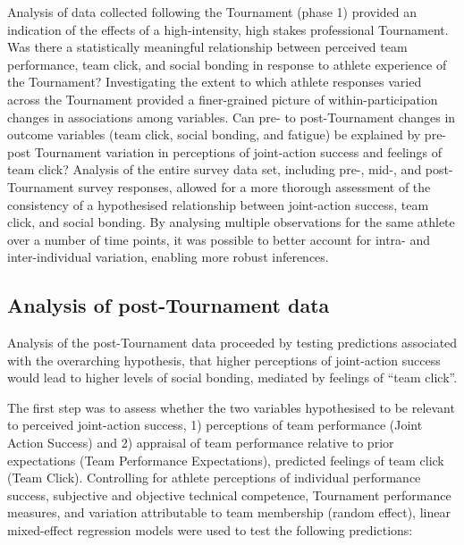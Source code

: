 Analysis of data collected following the Tournament (phase 1) provided an indication of the effects of a high-intensity, high stakes professional Tournament. Was there a statistically meaningful relationship between perceived team performance, team click, and social bonding in response to athlete experience of the Tournament?  Investigating the extent to which athlete responses varied across the Tournament provided a finer-grained picture of within-participation changes in associations among variables.  Can pre- to post-Tournament changes in outcome variables (team click, social bonding, and fatigue) be explained by pre-post Tournament variation in perceptions of joint-action success and feelings of team click?  Analysis of the entire survey data set, including pre-, mid-, and post-Tournament survey responses, allowed for a more thorough assessment of the consistency of a hypothesised relationship between joint-action success, team click, and social bonding. By analysing multiple observations for the same athlete over a number of time points, it was possible to better account for intra- and inter-individual variation, enabling more robust inferences.











\subsection{Analysis of post-Tournament data}
Analysis of the post-Tournament data proceeded by testing predictions associated with the overarching hypothesis, that higher perceptions of joint-action success would lead to higher levels of social bonding, mediated by feelings of ``team click''.

The first step was to assess whether the two variables hypothesised to be relevant to perceived joint-action success, 1) perceptions of team performance (Joint Action Success) and 2) appraisal of team performance relative to prior expectations (Team Performance Expectations), predicted feelings of team click (Team Click). Controlling for athlete perceptions of individual performance success, subjective and objective technical competence, Tournament performance measures, and variation attributable to team membership (random effect), linear mixed-effect regression models were used to test the following predictions:

